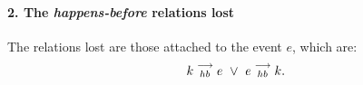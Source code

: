 
    \paragraph{2. The \emph{happens-before} relations lost}

    The relations lost are those attached to the event $e$, which are: 
    \begin{align}
        k\stackrel{\longrightarrow}{_{hb}}e \ \vee \ e\stackrel{\longrightarrow}{_{hb}}k.
    \end{align}
    